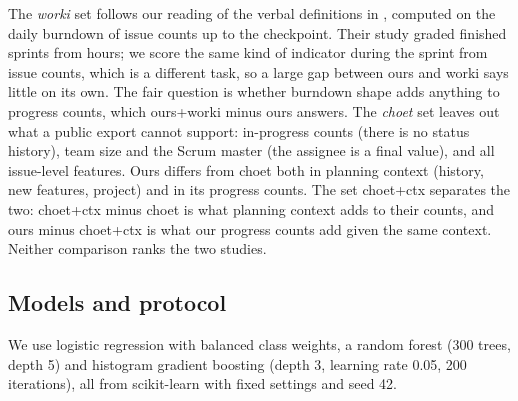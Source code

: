 The \emph{worki} set follows our reading of the verbal definitions in \cite{perez2024}, computed on the daily burndown of issue counts up to the checkpoint. Their study graded finished sprints from hours; we score the same kind of indicator during the sprint from issue counts, which is a different task, so a large gap between ours and worki says little on its own. The fair question is whether burndown shape adds anything to progress counts, which ours+worki minus ours answers. The \emph{choet} set leaves out what a public export cannot support: in-progress counts (there is no status history), team size and the Scrum master (the assignee is a final value), and all issue-level features. Ours differs from choet both in planning context (history, new features, project) and in its progress counts. The set choet+ctx separates the two: choet+ctx minus choet is what planning context adds to their counts, and ours minus choet+ctx is what our progress counts add given the same context. Neither comparison ranks the two studies.

\subsection{Models and protocol}

We use logistic regression with balanced class weights, a random forest \cite{breiman2001} (300 trees, depth 5) and histogram gradient boosting \cite{friedman2001} (depth 3, learning rate 0.05, 200 iterations), all from scikit-learn \cite{sklearn} with fixed settings and seed 42.

